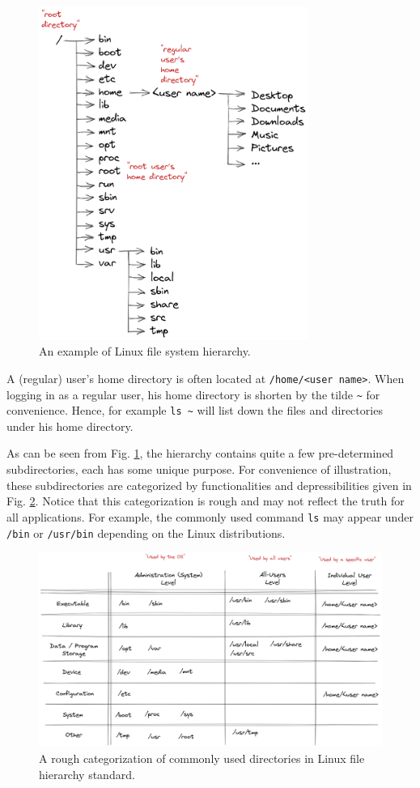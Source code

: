 \begin{figure}[htbp]
	\centering
	\includegraphics[width=250pt]{chapters/part-1/figures/linux_file_hierarchy.png}
	\caption{An example of Linux file system hierarchy.} \label{ch:fm:fig:hierarchy}
\end{figure}

A (regular) user's home directory is often located at \verb|/home/<user name>|. When logging in as a regular user, his home directory is shorten by the tilde \verb|~| for convenience. Hence, for example \verb|ls ~| will list down the files and directories under his home directory.

As can be seen from Fig. \ref{ch:fm:fig:hierarchy}, the hierarchy contains quite a few pre-determined subdirectories, each has some unique purpose. For convenience of illustration, these subdirectories are categorized by functionalities and depressibilities given in Fig. \ref{ch:fm:fig:directorycate}. Notice that this categorization is rough and may not reflect the truth for all applications. For example, the commonly used command \verb|ls| may appear under \verb|/bin| or \verb|/usr/bin| depending on the Linux distributions.

\begin{figure}[htbp]
	\centering
	\includegraphics[width=350pt]{chapters/part-1/figures/linux_directory_cate.png}
	\caption{A rough categorization of commonly used directories in Linux file hierarchy standard.} \label{ch:fm:fig:directorycate}
\end{figure}


